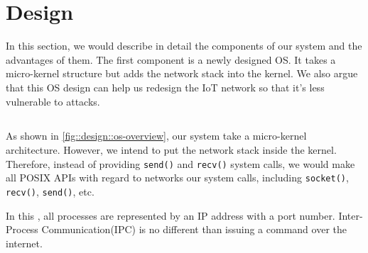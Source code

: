 \section{Design}

In this section, we would describe in detail the components of our system and the advantages of them.
The first component is a newly designed OS. 
It takes a micro-kernel structure but adds the network stack into the kernel.
We also argue that this OS design can help us redesign the IoT network so that it's less vulnerable to attacks.

\subsection{\ritos}

As shown in \autoref{fig::design::os-overview}, our system take a micro-kernel architecture.
However, we intend to put the network stack inside the kernel.
Therefore, instead of providing \texttt{send()} and \texttt{recv()} system calls, we would make all POSIX APIs with regard to networks our system calls, including \texttt{socket()}, \texttt{recv()}, \texttt{send()}, etc.

In this \ritos, all processes are represented by an IP address with a port number. Inter-Process Communication(IPC) is no different than issuing a command over the internet.

